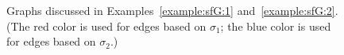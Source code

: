 \documentclass[journal,lettersize,twocolumn]{IEEEtran} %
\begin{document}
\begin{appendices}
\begin{figure}[t]
  \begin{centering}
    \subfloat[]{}
    \hspace{0.75cm}
    \subfloat[]{}
    \hspace{0.75cm}
    \subfloat[]{}
    \hspace{0.75cm}
    \subfloat[]{}
    \medskip
    \caption{Graphs discussed in Examples~\ref{example:sfG:1}
      and~\ref{example:sfG:2}. (The red color is used for edges based on
      $\sigma_1$; the blue color is used for edges based on $\sigma_2$.)}
    \label{fig:example:sfG:1}
  \end{centering}
\end{figure}

%

%
%

\end{appendices}

%
%

\ifx\withclearpagecommands\x
\clearpage 
\fi

\balance

\begin{footnotesize}
  
  
\end{footnotesize}

%
%
\end{document}
